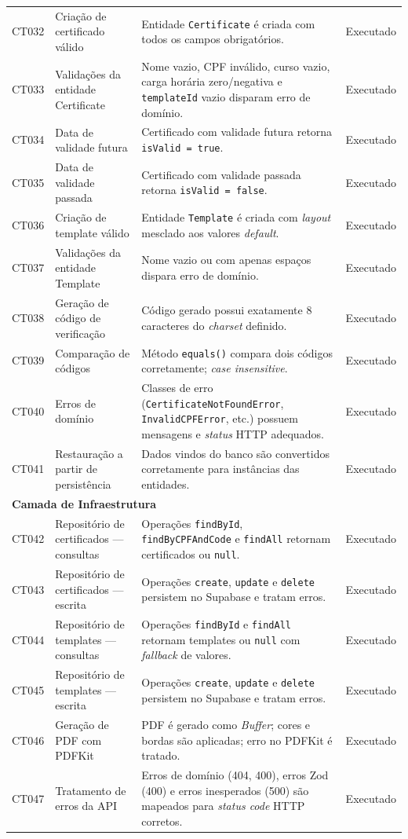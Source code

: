 \begin{longtable}{p{1.2cm} p{4.2cm} p{7.5cm} p{2.6cm}}
CT032 & Criação de certificado válido & Entidade \texttt{Certificate} é criada com todos os campos obrigatórios. & Executado \\
CT033 & Validações da entidade Certificate & Nome vazio, CPF inválido, curso vazio, carga horária zero/negativa e \texttt{templateId} vazio disparam erro de domínio. & Executado \\
CT034 & Data de validade futura & Certificado com validade futura retorna \texttt{isValid = true}. & Executado \\
CT035 & Data de validade passada & Certificado com validade passada retorna \texttt{isValid = false}. & Executado \\
CT036 & Criação de template válido & Entidade \texttt{Template} é criada com \textit{layout} mesclado aos valores \textit{default}. & Executado \\
CT037 & Validações da entidade Template & Nome vazio ou com apenas espaços dispara erro de domínio. & Executado \\
CT038 & Geração de código de verificação & Código gerado possui exatamente 8 caracteres do \textit{charset} definido. & Executado \\
CT039 & Comparação de códigos & Método \texttt{equals()} compara dois códigos corretamente; \textit{case insensitive}. & Executado \\
CT040 & Erros de domínio & Classes de erro (\texttt{CertificateNotFoundError}, \texttt{InvalidCPFError}, etc.) possuem mensagens e \textit{status} HTTP adequados. & Executado \\
CT041 & Restauração a partir de persistência & Dados vindos do banco são convertidos corretamente para instâncias das entidades. & Executado \\

\midrule
\multicolumn{3}{l}{\textbf{Camada de Infraestrutura}} \\
\midrule

CT042 & Repositório de certificados — consultas & Operações \texttt{findById}, \texttt{findByCPFAndCode} e \texttt{findAll} retornam certificados ou \texttt{null}. & Executado \\
CT043 & Repositório de certificados — escrita & Operações \texttt{create}, \texttt{update} e \texttt{delete} persistem no Supabase e tratam erros. & Executado \\
CT044 & Repositório de templates — consultas & Operações \texttt{findById} e \texttt{findAll} retornam templates ou \texttt{null} com \textit{fallback} de valores. & Executado \\
CT045 & Repositório de templates — escrita & Operações \texttt{create}, \texttt{update} e \texttt{delete} persistem no Supabase e tratam erros. & Executado \\
CT046 & Geração de PDF com PDFKit & PDF é gerado como \textit{Buffer}; cores e bordas são aplicadas; erro no PDFKit é tratado. & Executado \\
CT047 & Tratamento de erros da API & Erros de domínio (404, 400), erros Zod (400) e erros inesperados (500) são mapeados para \textit{status code} HTTP corretos. & Executado \\


\end{longtable}
